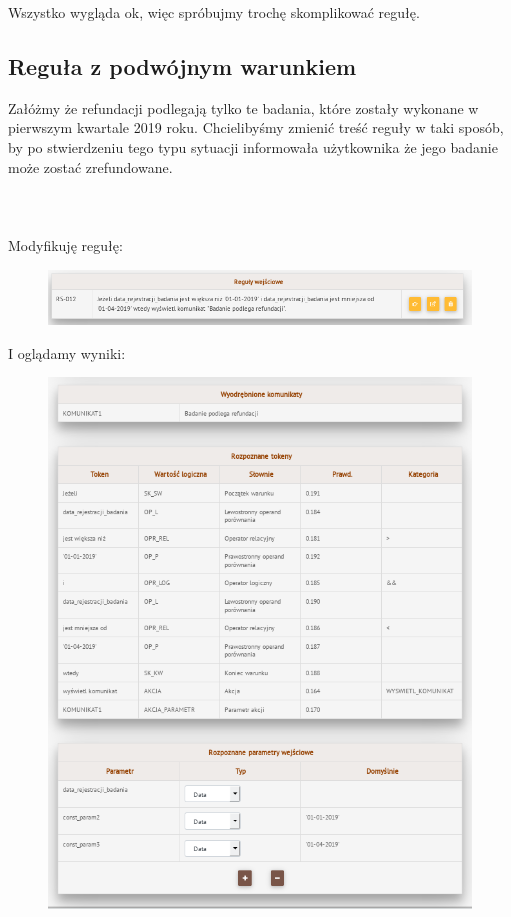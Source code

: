 Wszystko wygląda ok, więc spróbujmy trochę skomplikować regułę. 

\subsection{Reguła z podwójnym warunkiem}
Załóżmy że refundacji podlegają tylko te badania, które zostały wykonane w pierwszym kwartale 2019 roku. Chcielibyśmy zmienić treść reguły w taki sposób, by po stwierdzeniu tego typu sytuacji informowała użytkownika że jego badanie może zostać zrefundowane.
\\ \\
\\ \\
Modyfikuję regułę:
\begin{figure}[H]
	\centering
	\includegraphics[scale=0.8]{img/app-eksperymenty/p2-1.png}
\end{figure}
I oglądamy wyniki:
\begin{figure}[H]
	\centering
	\includegraphics[scale=0.8]{img/app-eksperymenty/p2-2.png}
\end{figure}
